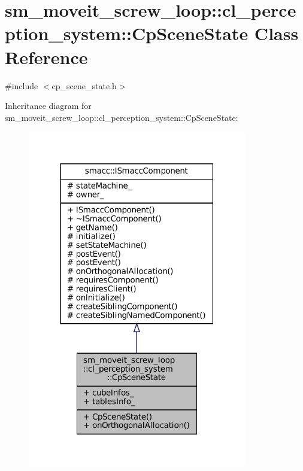 \hypertarget{classsm__moveit__screw__loop_1_1cl__perception__system_1_1CpSceneState}{}\section{sm\+\_\+moveit\+\_\+screw\+\_\+loop\+:\+:cl\+\_\+perception\+\_\+system\+:\+:Cp\+Scene\+State Class Reference}
\label{classsm__moveit__screw__loop_1_1cl__perception__system_1_1CpSceneState}


{\ttfamily \#include $<$cp\+\_\+scene\+\_\+state.\+h$>$}



Inheritance diagram for sm\+\_\+moveit\+\_\+screw\+\_\+loop\+:\+:cl\+\_\+perception\+\_\+system\+:\+:Cp\+Scene\+State\+:
\nopagebreak
\begin{figure}[H]
\begin{center}
\leavevmode
\includegraphics[width=271pt]{classsm__moveit__screw__loop_1_1cl__perception__system_1_1CpSceneState__inherit__graph}
\end{center}
\end{figure}


